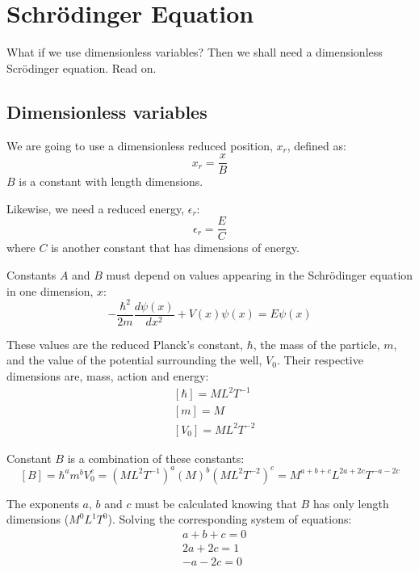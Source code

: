 \chapter{Schrödinger Equation}

What if we use dimensionless variables? Then we shall need a dimensionless
Scrödinger equation. Read on.

\section{Dimensionless variables}
We are going to use a dimensionless reduced position, $x_r$, defined as:
\begin{equation}
\label{reduced_x}
	x_r = \frac{x}{B}
\end{equation}
$B$ is a constant with length dimensions.

Likewise, we need a reduced energy, $\epsilon_r$:
\begin{equation}
\label{reduced_e}
	\epsilon_r = \frac{E}{C}
\end{equation}
where $C$ is another constant that has dimensions of energy.

Constants $A$ and $B$ must depend on values appearing in the Schrödinger
equation in one dimension, $x$:
\begin{equation}
\label{schro1}
-\frac{\hbar^2}{2m}\frac{d\psi(x)}{dx^2}+V(x)\psi(x) = E\psi(x)
\end{equation}

These values are the reduced Planck's constant, $\hbar$, the mass of the
particle, $m$, and the value of the potential surrounding the well, $V_0$.
Their respective dimensions are, mass, action and energy:
\begin{align*}
&[\hbar] = ML^2T^{-1}\\
&[m] = M\\
&[V_0] = ML^2T^{-2}
\end{align*}

Constant $B$ is a combination of these constants:
\[
[B] = \hbar^a m^b V_0^c =
(ML^2T^{-1})^a (M)^b (ML^2T^{-2})^c =
M^{a+b+c} L^{2a+2c} T^{-a-2c}
\]

The exponents $a$, $b$ and $c$ must be calculated knowing that $B$ has only
length dimensions ($M^0 L^1 T^0$).
Solving the corresponding system of equations:
\begin{align*}
&a + b + c = 0\\
&2a+2c = 1\\
&-a-2c = 0
\end{align*}

